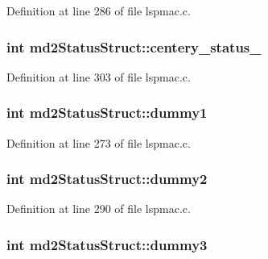 Definition at line 286 of file lspmac.\-c.

\hypertarget{structmd2StatusStruct_aa242098c185cce8f852cd6e081ef0b1d}{
\subsubsection[{centery\-\_\-status\-\_\-2}]{\setlength{\rightskip}{0pt plus 5cm}int md2\-Status\-Struct\-::centery\-\_\-status\-\_}}\label{structmd2StatusStruct_aa242098c185cce8f852cd6e081ef0b1d}


Definition at line 303 of file lspmac.\-c.

\hypertarget{structmd2StatusStruct_a3a2dff3e6a1a346806a655e8404e0f53}{
\subsubsection[{dummy1}]{\setlength{\rightskip}{0pt plus 5cm}int md2\-Status\-Struct\-::dummy1}}\label{structmd2StatusStruct_a3a2dff3e6a1a346806a655e8404e0f53}


Definition at line 273 of file lspmac.\-c.

\hypertarget{structmd2StatusStruct_a4df936acc498498baba111edb82597a1}{
\subsubsection[{dummy2}]{\setlength{\rightskip}{0pt plus 5cm}int md2\-Status\-Struct\-::dummy2}}\label{structmd2StatusStruct_a4df936acc498498baba111edb82597a1}


Definition at line 290 of file lspmac.\-c.

\hypertarget{structmd2StatusStruct_adb2dc5bdbf99def51018558201508009}{
\subsubsection[{dummy3}]{\setlength{\rightskip}{0pt plus 5cm}int md2\-Status\-Struct\-::dummy3}}\label{structmd2StatusStruct_adb2dc5bdbf99def51018558201508009}


